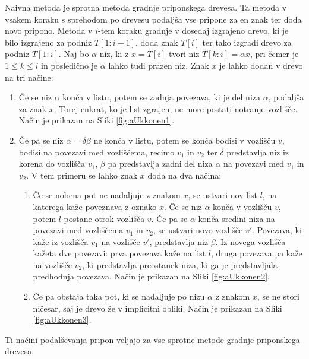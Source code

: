 Naivna metoda je sprotna metoda gradnje priponskega drevesa.
Ta metoda v vsakem koraku s sprehodom po drevesu podaljša vse pripone za en znak ter doda novo pripono. Metoda v $i$-tem koraku gradnje v dosedaj izgrajeno drevo, ki je bilo izgrajeno za podniz $T[1:i-1]$, doda znak $T[i]$ ter tako izgradi drevo za podniz $T[1:i]$. 
Naj bo $\alpha$ niz, ki z $x=T[i]$ tvori niz $T[k:i]=\alpha x$, pri čemer je $1\le k \le i $ in posledično je $\alpha$ lahko tudi prazen niz. Znak $x$ je lahko dodan v drevo na tri načine:
\begin{enumerate}
    \item \label{enum:dodajanje1} Če se niz $\alpha$ konča v listu, potem se zadnja povezava, ki je del niza $\alpha$, podaljša za znak $x$. Torej enkrat, ko je list zgrajen, ne more postati notranje vozlišče. Način je prikazan na Sliki \ref{fig:aUkkonen1}.
    \item Če pa se niz $\alpha=\delta\beta$ ne konča v listu, potem se konča bodisi v vozlišču $v$, bodisi na povezavi med vozliščema, recimo $v_1$ in $v_2$ ter $\delta$ predstavlja niz iz korena do vozlišča $v_1$, $\beta$ pa predstavlja zadni del niza $\alpha$ na povezavi med $v_1$ in $v_2$. V tem primeru se lahko znak $x$ doda na dva načina:
    \begin{enumerate}
        \item \label{enum:dodajanje2} Če se nobena pot ne nadaljuje z znakom $x$, se ustvari nov list $l$, na katerega kaže poveznava z oznako $x$. Če se niz $\alpha$ konča v vozlišču $v$, potem $l$ postane otrok vozlišča $v$. Če pa se $\alpha$ konča sredini niza na povezavi med vozliščema $v_1$ in $v_2$, se ustvari novo vozlišče $v'$. Povezava, ki kaže iz vozlišča $v_1$ na vozlišče $v'$, predstavlja niz $\beta$. Iz novega vozlišča kažeta dve povezavi: prva povezava kaže na list $l$, druga povezava pa kaže na vozlišče $v_2$, ki predstavlja preostanek niza, ki ga je predstavljala predhodnja povezava. Način je prikazan na Sliki \ref{fig:aUkkonen2}.
        \item \label{enum:dodajanje3} Če pa obstaja taka pot, ki se nadaljuje po nizu $\alpha$ z znakom $x$, se ne stori ničesar, saj je drevo že v implicitni obliki. Način je prikazan na Sliki \ref{fig:aUkkonen3}.
    \end{enumerate}    
\end{enumerate}
Ti načini podalševanja pripon veljajo za vse sprotne metode gradnje priponskega drevesa.
